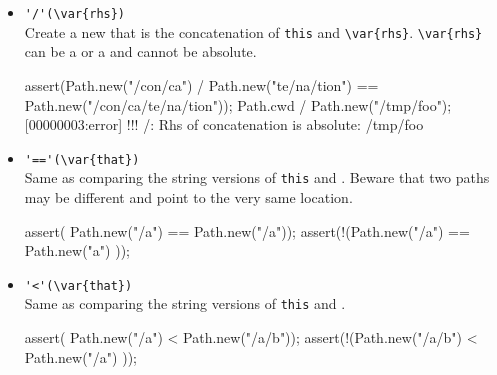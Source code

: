 \begin{itemize}
\item \lstinline|'/'(\var{rhs})|\\
  Create a new  that is the concatenation of
  \lstinline|this| and \lstinline|\var{rhs}|. \lstinline|\var{rhs}|
  can be a  or a  and cannot be absolute.
\begin{urbiscript}[firstnumber=last]
assert(Path.new("/con/ca") / Path.new("te/na/tion")
       == Path.new("/con/ca/te/na/tion"));
Path.cwd / Path.new("/tmp/foo");
[00000003:error] !!! /: Rhs of concatenation is absolute: /tmp/foo
\end{urbiscript}

\item \lstinline|'=='(\var{that})|\\
  Same as comparing the string versions of \lstinline|this| and
  .  Beware that two paths may be different and point to the
  very same location.
\begin{urbiscript}[firstnumber=last]
assert(  Path.new("/a")  == Path.new("/a"));
assert(!(Path.new("/a")  == Path.new("a")  ));
\end{urbiscript}

\item \lstinline|'<'(\var{that})|\\
  Same as comparing the string versions of \lstinline|this| and
  .
\begin{urbiscript}[firstnumber=last]
assert(  Path.new("/a")   < Path.new("/a/b"));
assert(!(Path.new("/a/b") < Path.new("/a")  ));
\end{urbiscript}

\end{itemize}


